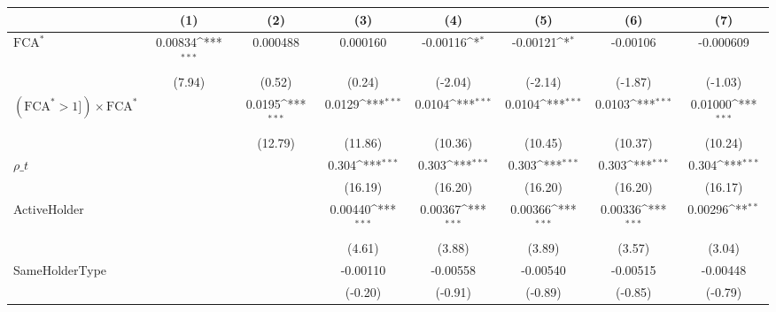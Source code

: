 {
\def\sym#1{\ifmmode^{#1}\else\(^{#1}\)\fi}
\begin{tabular}{l*{7}{c}}
\hline\hline
                    &\multicolumn{1}{c}{(1)}         &\multicolumn{1}{c}{(2)}         &\multicolumn{1}{c}{(3)}         &\multicolumn{1}{c}{(4)}         &\multicolumn{1}{c}{(5)}         &\multicolumn{1}{c}{(6)}         &\multicolumn{1}{c}{(7)}         \\
\hline
$ \text{FCA}^* $    &     0.00834\sym{***}&    0.000488         &    0.000160         &    -0.00116\sym{*}  &    -0.00121\sym{*}  &    -0.00106         &   -0.000609         \\
                    &      (7.94)         &      (0.52)         &      (0.24)         &     (-2.04)         &     (-2.14)         &     (-1.87)         &     (-1.03)         \\
[1em]
 $ (\text{FCA}^* > 1]) \times {\text{FCA} ^*}  $ &                     &      0.0195\sym{***}&      0.0129\sym{***}&      0.0104\sym{***}&      0.0104\sym{***}&      0.0103\sym{***}&     0.01000\sym{***}\\
                    &                     &     (12.79)         &     (11.86)         &     (10.36)         &     (10.45)         &     (10.37)         &     (10.24)         \\
[1em]
$ \rho\_t $          &                     &                     &       0.304\sym{***}&       0.303\sym{***}&       0.303\sym{***}&       0.303\sym{***}&       0.304\sym{***}\\
                    &                     &                     &     (16.19)         &     (16.20)         &     (16.20)         &     (16.20)         &     (16.17)         \\
[1em]
ActiveHolder        &                     &                     &     0.00440\sym{***}&     0.00367\sym{***}&     0.00366\sym{***}&     0.00336\sym{***}&     0.00296\sym{**} \\
                    &                     &                     &      (4.61)         &      (3.88)         &      (3.89)         &      (3.57)         &      (3.04)         \\
[1em]
SameHolderType      &                     &                     &    -0.00110         &    -0.00558         &    -0.00540         &    -0.00515         &    -0.00448         \\
                    &                     &                     &     (-0.20)         &     (-0.91)         &     (-0.89)         &     (-0.85)         &     (-0.79)         \\

\end{tabular}}
